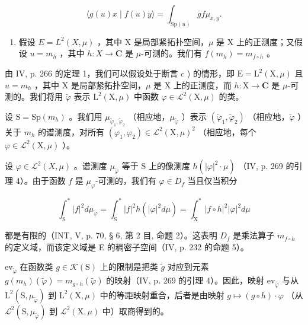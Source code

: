 \[
\langle g (u) x \mid f (u) y \rangle = \int_ {\mathrm{Sp} (u)} \overline {{g}} f \mu_ {x, y}.\tag{7}
\]

\begin{enumerate}
\def\labelenumi{\alph{enumi})}
\setcounter{enumi}{2}
\tightlist
\item
  假设 \(E = L^{2}(X, \mu)\) ，其中 X 是局部紧拓扑空间，\(\mu\) 是 X 上的正测度；又假设 \(u = m_{h}\) ，其中 \(h: X \to \mathbf C\) 是 \(\mu\)-可测的。我们有 \(f(m_{h}) = m_{f \circ h}\) 。
\end{enumerate}

由 IV, p. 266 的定理 1，我们可以假设处于断言 \(c\) ) 的情形，即 \(\mathrm{E} = \mathrm{L}^2 (\mathrm{X},\mu)\) 且 \(u = m_h\) ，其中 X 是局部紧拓扑空间，\(\mu\) 是 X 上的正测度，而 \(h\colon \mathrm{X}\to \mathbf{C}\) 是 \(\mu\)-可测的。我们将用 \(\widetilde{\varphi}\) 表示 \(\mathrm{L}^2 (\mathrm{X},\mu)\) 中函数 \(\varphi \in \mathcal{L}^2 (\mathrm{X},\mu)\) 的类。

设 \(\mathrm{S} = \mathrm{Sp}(m_h)\) 。我们用 \(\mu_{\widetilde{\varphi}_1, \widetilde{\varphi}_2}\) （相应地，\(\mu_{\widetilde{\varphi}}\) ）表示 \((\widetilde{\varphi}_1, \widetilde{\varphi}_2)\) （相应地，\(\widetilde{\varphi}\) ）关于 \(m_h\) 的谱测度，对所有 \((\varphi_1, \varphi_2) \in \mathcal{L}^2(\mathrm{X}, \mu)^2\) （相应地，每个 \(\varphi \in \mathcal{L}^2(\mathrm{X}, \mu)\) ）。

设 \(\varphi\in\mathcal{L}^{2}(X,\mu)\) 。谱测度 \(\mu_{\widetilde{\varphi}}\) 等于 S 上的像测度 \(h(|\varphi|^{2}\cdot\mu)\) （IV, p. 269 的引理 4）。由于函数 \(f\) 是 \(\mu_{\varphi}\)-可测的，我们有 \(\varphi\in D_{f}\) 当且仅当积分

\[
\int_ {\mathrm{S}} ^ {*} | f | ^ {2} d \mu_ {\widetilde {\varphi}} = \int_ {\mathrm{S}} ^ {*} | f | ^ {2} h (| \varphi | ^ {2} d \mu) = \int_ {\mathrm{X}} ^ {*} | f \circ h | ^ {2} | \varphi | ^ {2} d \mu
\]

都是有限的（INT, V, p. 70, § 6, 第 2 目, 命题 2）。这表明 \(D_{f}\) 是乘法算子 \(m_{f\circ h}\) 的定义域，而该定义域是 E 的稠密子空间（IV, p. 232 的命题 5）。

\(\mathrm{ev}_{\widetilde{\varphi}}\) 在函数类 \(g \in \mathcal{K}(\mathrm{S})\) 上的限制是把类 \(\widetilde{g}\) 对应到元素 \(g(m_h)(\widetilde{\varphi}) = m_{g \circ h}(\widetilde{\varphi})\) 的映射（IV, p. 269 的引理 4）。因此，映射 \(\mathrm{ev}_{\widetilde{\varphi}}\) 与从 \(\mathrm{L}^2(\mathrm{S}, \mu_{\widetilde{\varphi}})\) 到 \(\mathrm{L}^2(\mathrm{X}, \mu)\) 中的等距映射重合，后者是由映射 \(g \mapsto (g \circ h) \cdot \varphi\) （从 \(\mathcal{L}^2(\mathrm{S}, \mu_{\widetilde{\varphi}})\) 到 \(\mathcal{L}^2(\mathrm{X}, \mu)\) 中）取商得到的。

